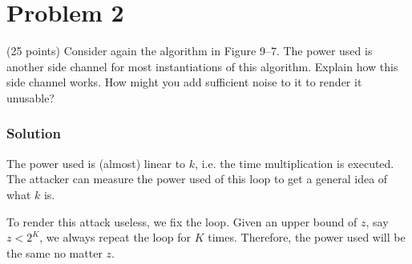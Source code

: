 \section*{Problem 2}
(25 points) Consider again the algorithm in Figure 9–7. 
The power used is another side channel for most instantiations of this algorithm. 
Explain how this side channel works. 
How might you add sufficient noise to it to render it unusable?

\subsubsection*{Solution}

The power used is (almost) linear to $k$, i.e. the time multiplication is executed.
The attacker can measure the power used of this loop to get a general idea of what $k$ is.

To render this attack useless, we fix the loop.
Given an upper bound of $z$, say $z < 2^K$, we always repeat the loop for $K$ times.
Therefore, the power used will be the same no matter $z$.